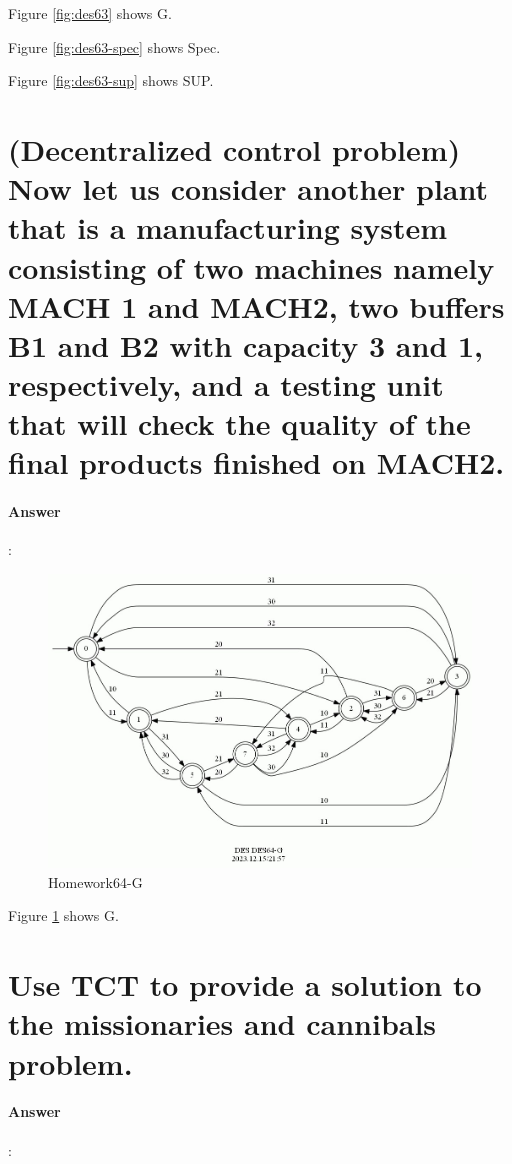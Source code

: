 \documentclass{article}
\begin{document}
Figure \ref{fig:des63} shows G.

Figure \ref{fig:des63-spec} shows Spec.

Figure \ref{fig:des63-sup} shows SUP.





\section{(Decentralized control problem) Now let us consider another plant that is a manufacturing system consisting of two machines namely MACH 1 and MACH2, two buffers B1 and B2 with capacity 3 and 1, respectively, and a testing unit that will check the quality of the final products finished on MACH2.}

\paragraph{Answer}:

\begin{figure}[h!]
  \centering
  \includegraphics[width=\linewidth]{assets/DES64-G.jpg}
  \caption{Homework64-G}
  \label{fig:des64}
\end{figure}

Figure \ref{fig:des64} shows G.

\section{Use TCT to provide a solution to the missionaries and cannibals problem.}

\paragraph{Answer}:
\end{document}
